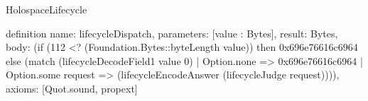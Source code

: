 \begin{lexlean}{HolospaceLifecycle}
\begin{semanticmodule}
definition{
  name: lifecycleDispatch,
  parameters: [value : Bytes],
  result: Bytes,
  body: (if (112 <? (Foundation.Bytes::byteLength value)) then 0x696e76616c6964 else (match (lifecycleDecodeField1 value 0)
    | Option.none => 0x696e76616c6964
    | Option.some request => (lifecycleEncodeAnswer (lifecycleJudge request)))),
  axioms: [Quot.sound, propext]
}
\end{semanticmodule}
\end{lexlean}

